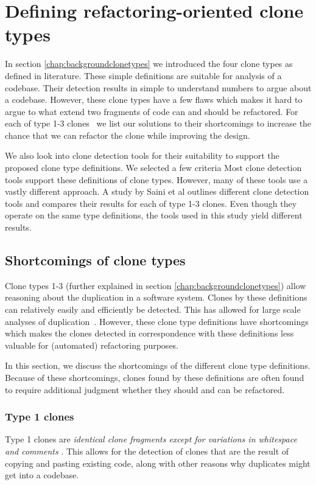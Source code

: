 \chapter{Defining refactoring-oriented clone types}\label{chap:clonetypes}
In section \ref{chap:backgroundclonetypes} we introduced the four clone types as defined in literature. These simple definitions are suitable for analysis of a codebase. Their detection results in simple to understand numbers to argue about a codebase. However, these clone types have a few flaws which makes it hard to argue to what extend two fragments of code can and should be refactored. For each of type 1-3 clones~\cite{roy2007survey} we list our solutions to their shortcomings to increase the chance that we can refactor the clone while improving the design.

We also look into clone detection tools for their suitability to support the proposed clone type definitions. We selected a few criteria  Most clone detection tools support these definitions of clone types. However, many of these tools use a vastly different approach. A study by Saini et al \cite{saini2018towards} outlines different clone detection tools and compares their results for each of type 1-3 clones. Even though they operate on the same type definitions, the tools used in this study yield different results.

\section{Shortcomings of clone types}
Clone types 1-3 (further explained in section \ref{chap:backgroundclonetypes}) allow reasoning about the duplication in a software system. Clones by these definitions can relatively easily and efficiently be detected. This has allowed for large scale analyses of duplication~\cite{livieri2007very}. However, these clone type definitions have shortcomings which makes the clones detected in correspondence with these definitions less valuable for (automated) refactoring purposes.

In this section, we discuss the shortcomings of the different clone type definitions. Because of these shortcomings, clones found by these definitions are often found to require additional judgment whether they should and can be refactored.

\subsection{Type 1 clones}\label{sec:type1}
Type 1 clones are \textit{identical clone fragments except for variations in whitespace and comments} \cite{roy2007survey}. This allows for the detection of clones that are the result of copying and pasting existing code, along with other reasons why duplicates might get into a codebase.

